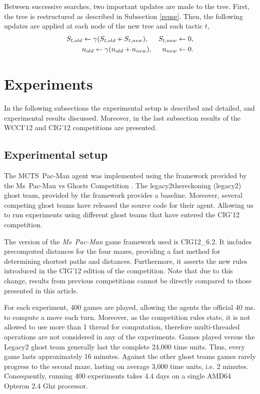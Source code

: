 \documentclass[journal]{IEEEtran}
\begin{document}
Between successive searches, two important updates are made to the tree. First, the tree is restructured as described in Subsection \ref{reuse}. Then, the
following updates are applied at each node of the new tree and each tactic $t$, 
\begin{eqnarray}
S_{t,old} \leftarrow \gamma (S_{t,old} + S_{t,new}), \mbox{\hspace{0.5cm}} S_{t,new} \leftarrow 0, \label{eq:decay1} \\
n_{old} \leftarrow \gamma (n_{old} + n_{new}), \mbox{\hspace{0.5cm}} n_{new} \leftarrow 0.         \label{eq:decay2}
\end{eqnarray}


\section{Experiments}
\label{experiments}
In the following subsections the experimental setup is described and detailed, and experimental results discussed. Moreover, in the last subsection results of the WCCI'12 and CIG'12 competitions are presented.

\subsection{Experimental setup}
The {\sc MCTS~Pac-Man} agent was implemented using the framework provided by the Ms~Pac-Man vs Ghosts Competition \cite{mspacmanvsghost}. The {\sc legacy2thereckoning } ({\sc legacy2}) ghost team, provided by the framework provides a baseline. Moreover, several competing ghost teams have released the source code for their agent. Allowing us to run experiments using different ghost teams that have entered the CIG'12 competition.

The version of the {\it{Ms~Pac-Man}} game framework used is {\sc CIG12\_6.2}. It includes precomputed distances for the four mazes, providing a fast method for determining shortest paths and distances. Furthermore, it asserts the new rules introduced in the CIG'12 edition of the competition. Note that due to this change, results from previous competitions cannot be directly compared to those presented in this article.

For each experiment, 400 games are played, allowing the agents the official 40 ms. to compute a move each turn. Moreover, as the competition rules state, it is not allowed to use more than 1 thread for computation, therefore multi-threaded operations are not considered in any of the experiments. Games played versus the {\sc Legacy2} ghost team generally last the complete 24,000 time units. Thus, every game lasts approximately 16 minutes. Against the other ghost teams games rarely progress to the second maze, lasting on average 3,000 time units, i.e. 2 minutes. Consequently, running 400 experiments takes 4.4 days on a single AMD64 Opteron 2.4 Ghz processor.
\end{document}
